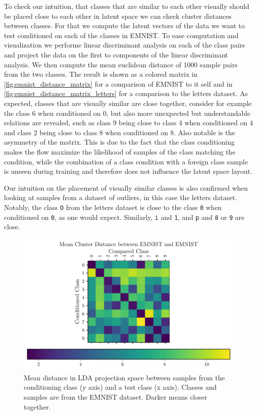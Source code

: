 To check our intuition, that classes that are similar to each other visually
should be placed close to each other in latent space we can check cluster
distances between classes. For that we compute the latent vectors of the data we
want to test conditioned on each of the classes in EMNIST. To ease computation
and visualization we performe linear discriminant analysis on each of the class
pairs and project the data on the first to components of the linear
discriminant analysis. We then compute the mean euclidean distance of 1000
sample pairs from the two classes. The result is shown as a colored matrix in
\autoref{fig:emnist_distance_matrix} for a comparison of EMNIST to it self and
in \autoref{fig:emnist_distance_matrix_letters} for a comparison to the letters
dataset. As expected, classes that are visually similar are close together,
consider for example the class 6 when conditioned on 0, but also more
unexpected but understandable relations are revealed, such as class 9 being
close to class 4 when conditioned on 4 and class 2 being close to class 8 when
conditioned on 8. Also notable is the asymmetry of the matrix. This is due to
the fact that the class conditioning makes the flow maximize the likelihood of
samples of the class matching the condition, while the combination of a class
condition with a foreign class sample is unseen during training and therefore
does not influence the latent space layout.

Our intuition on the placement of visually similar classes is also confirmed
when looking at samples from a dataset of outliers, in this case the letters
dataset. Notably, the class \texttt{O} from the letters dataset is close to the
class \texttt{0} when conditioned on \texttt{0}, as one would expect.
Similarly, \texttt{i} and \texttt{1}, and \texttt{p} and \texttt{8} or
\texttt{9} are close.

\begin{figure}[htpb]
	\centering
	\includegraphics{figures/samples/emnist_distance_matrix_EMNIST_lda.pdf}
	\caption{Mean distance in LDA projection space between samples from the
		conditioning class (y axis) and a test class (x axis). Classes and
		samples are from the EMNIST dataset. Darker means closer
		together.}%
	\label{fig:emnist_distance_matrix}
\end{figure}

